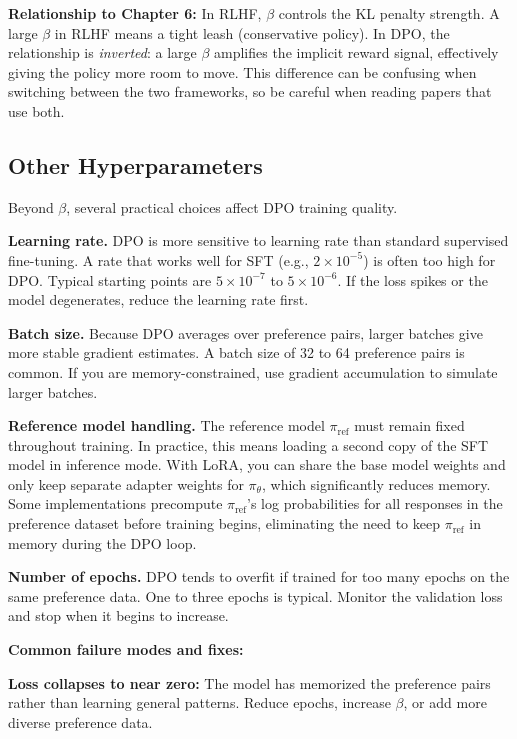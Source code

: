 \begin{chapterenv}
\begin{infobox}
\textbf{Relationship to Chapter 6:} In RLHF, $\beta$ controls the KL penalty strength. A large $\beta$ in RLHF means a tight leash (conservative policy). In DPO, the relationship is \textit{inverted}: a large $\beta$ amplifies the implicit reward signal, effectively giving the policy more room to move. This difference can be confusing when switching between the two frameworks, so be careful when reading papers that use both.
\end{infobox}

\subsection{Other Hyperparameters}

Beyond $\beta$, several practical choices affect DPO training quality.

\textbf{Learning rate.} DPO is more sensitive to learning rate than standard supervised fine-tuning. A rate that works well for SFT (e.g., $2 \times 10^{-5}$) is often too high for DPO. Typical starting points are $5 \times 10^{-7}$ to $5 \times 10^{-6}$. If the loss spikes or the model degenerates, reduce the learning rate first.

\textbf{Batch size.} Because DPO averages over preference pairs, larger batches give more stable gradient estimates. A batch size of 32 to 64 preference pairs is common. If you are memory-constrained, use gradient accumulation to simulate larger batches.

\textbf{Reference model handling.} The reference model $\pi_{\text{ref}}$ must remain fixed throughout training. In practice, this means loading a second copy of the SFT model in inference mode. With LoRA, you can share the base model weights and only keep separate adapter weights for $\pi_\theta$, which significantly reduces memory. Some implementations precompute $\pi_{\text{ref}}$'s log probabilities for all responses in the preference dataset before training begins, eliminating the need to keep $\pi_{\text{ref}}$ in memory during the DPO loop.

\textbf{Number of epochs.} DPO tends to overfit if trained for too many epochs on the same preference data. One to three epochs is typical. Monitor the validation loss and stop when it begins to increase.

\begin{tipbox}
\textbf{Common failure modes and fixes:}

\textbf{Loss collapses to near zero:} The model has memorized the preference pairs rather than learning general patterns. Reduce epochs, increase $\beta$, or add more diverse preference data.


\end{tipbox}
\end{chapterenv}
